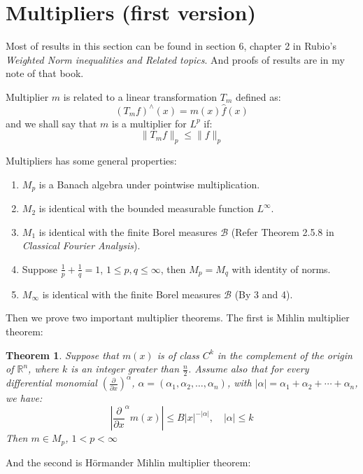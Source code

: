 \documentclass{report}
\theoremstyle{definition}
\theoremstyle{definition}
\theoremstyle{plain}
\newtheorem{theorem}{Theorem}
\numberwithin{theorem}{section}
\numberwithin{remark}{section}
\numberwithin{equation}{section}
\newcommand{\norm}[1]{\lVert#1\rVert}
\newcommand{\abs}[1]{\left\lvert#1\right\rvert}
\begin{document}
\section{Multipliers (first version)}
Most of results in this section can be found in section 6, chapter 2 in Rubio's \emph{Weighted Norm inequalities and Related topics}. And proofs of results are in my note of that book.\par
Multiplier $m$ is related to a linear transformation $T_m$ defined as:
\begin{equation*}
    (T_mf)^\wedge(x)=m(x)\hat{f}(x)
\end{equation*}
and we shall say that $m$ is a multiplier for $L^p$ if:
\begin{equation*}
    \norm{T_mf}_p\leq \norm{f}_p
\end{equation*}\par
Multipliers has some general properties:
\begin{enumerate}
    \item $M_p$ is a Banach algebra under pointwise multiplication.
    \item $M_2$ is identical with the bounded measurable function $L^\infty$.
    \item $M_1$ is identical with the finite Borel measures $\mathscr{B}$ (Refer Theorem 2.5.8 in \emph{Classical Fourier Analysis}).
    \item Suppose $\frac{1}{p}+\frac{1}{q}=1$, $1\leq p,q\leq \infty$, then $M_p=M_q$ with identity of norms.
    \item $M_\infty$ is identical with the finite Borel measures $\mathscr{B}$ (By 3 and 4).
\end{enumerate}
Then we prove two important multiplier theorems. The first is Mihlin multiplier theorem:
\begin{theorem}
    Suppose that $m(x)$ is of class $C^k$ in the complement of the origin of $\mathbb{R}^n$, where $k$ is an integer greater than $\frac{n}{2}$. Assume also that for every differential monomial $(\frac{\partial}{\partial x})^\alpha$, $\alpha=(\alpha_1,\alpha_2,\dots,\alpha_n)$, with $\abs{\alpha}=\alpha_1+\alpha_2+\cdots+\alpha_n$, we have:
    \begin{equation}\label{ieq: Mihlin}
        \abs{\frac{\partial}{\partial x}^\alpha m(x)}\leq B\abs{x}^{-\abs{\alpha}},\quad \abs{\alpha}\leq k
    \end{equation}
    Then $m\in M_p$, $1<p<\infty$
\end{theorem}
And the second is H\"{o}rmander Mihlin multiplier theorem:
\end{document}
